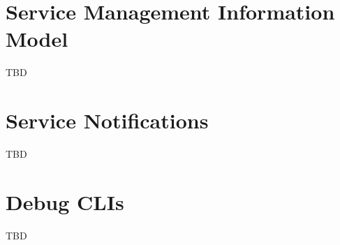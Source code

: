 \begin{flushleft}
\chapter{Service Management Information Model}
TBD
\chapter{Service Notifications}
TBD
\chapter{Debug CLIs}
TBD
\end{flushleft}